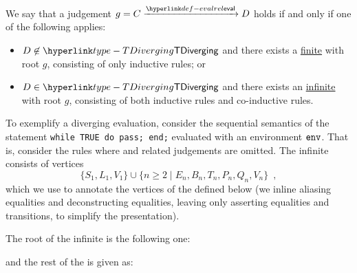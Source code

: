 \begin{definition}
We say that a judgement
$g = C \evalarrow D$ holds if and only if one of the following applies:
\begin{itemize}
  \item $D\not\in\TDiverging$ and there exists a \underline{finite} \derivationtreeterm{}
        with root $g$, consisting of only inductive rules; or
  \item $D\in\TDiverging$ and there exists an \underline{infinite} \derivationtreeterm{}
        with root $g$, consisting of both inductive rules and co-inductive rules.
\end{itemize}
\end{definition}


To exemplify a diverging evaluation, consider the sequential semantics
of the statement \verb|while TRUE do pass; end;| evaluated with
an environment $\texttt{env}$. That is, consider the rules where \executiongraphsterm{}
and related judgements are omitted.
The infinite \derivationtreeterm{} consists of vertices
\[
\{S_1, L_1, V_1\} \cup \{n \geq 2 \;|\; E_n, B_n, T_n, P_n, Q_n, V_n\} \enspace,
\]
which we use to annotate the vertices of the \derivationtreeterm{} defined below
(we inline aliasing equalities and deconstructing equalities,
leaving only asserting equalities and transitions, to simplify the presentation).

The root of the infinite \derivationtreeterm{} is the following one:
\begin{mathpar}
\end{mathpar}

and the rest of the \derivationtreeterm{} is given as:
\begin{mathpar}
\end{mathpar}

